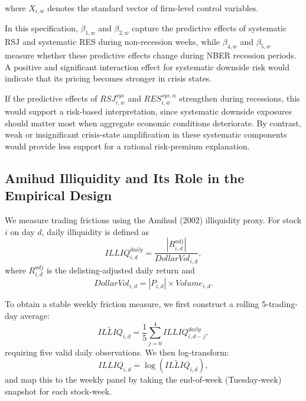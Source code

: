 \documentclass[11pt,a4paper]{article}
\begin{document}
where \(X_{i,w}\) denotes the standard vector of firm-level control
variables.

In this specification, \(\beta_{1,w}\) and \(\beta_{2,w}\) capture the
predictive effects of systematic RSJ and systematic RES during
non-recession weeks, while \(\beta_{4,w}\) and \(\beta_{5,w}\) measure
whether these predictive effects change during NBER recession periods.
A positive and significant interaction effect for systematic downside
risk would indicate that its pricing becomes stronger in crisis states.

If the predictive effects of \(RSJ^{sys}_{i,w}\) and
\(RES^{sys,\alpha}_{i,w}\) strengthen during recessions, this would
support a risk-based interpretation, since systematic downside exposures
should matter most when aggregate economic conditions deteriorate. By
contrast, weak or insignificant crisis-state amplification in these
systematic components would provide less support for a rational
risk-premium explanation.

\subsection{Amihud Illiquidity and Its Role in the Empirical Design}

We measure trading frictions using the Amihud (2002) illiquidity proxy.
For stock $i$ on day $d$, daily illiquidity is defined as
\begin{equation}
\textit{ILLIQ}^{daily}_{i,d}
=
\frac{|R^{adj}_{i,d}|}{\textit{DollarVol}_{i,d}},
\label{eq:illiq_daily}
\end{equation}
where $R^{adj}_{i,d}$ is the delisting-adjusted daily return and
\begin{equation}
\textit{DollarVol}_{i,d}=|P_{i,d}|\times \textit{Volume}_{i,d}.
\label{eq:dollarvol}
\end{equation}

To obtain a stable weekly friction measure, we first construct a rolling
5-trading-day average:
\begin{equation}
\widetilde{\textit{ILLIQ}}_{i,d}
=
\frac{1}{5}\sum_{j=0}^{4}\textit{ILLIQ}^{daily}_{i,d-j},
\label{eq:illiq_roll}
\end{equation}
requiring five valid daily observations. We then log-transform:
\begin{equation}
\textit{ILLIQ}_{i,d}=\log\!\left(\widetilde{\textit{ILLIQ}}_{i,d}\right),
\label{eq:illiq_log}
\end{equation}
and map this to the weekly panel by taking the end-of-week (Tuesday-week)
snapshot for each stock-week.
\end{document}
